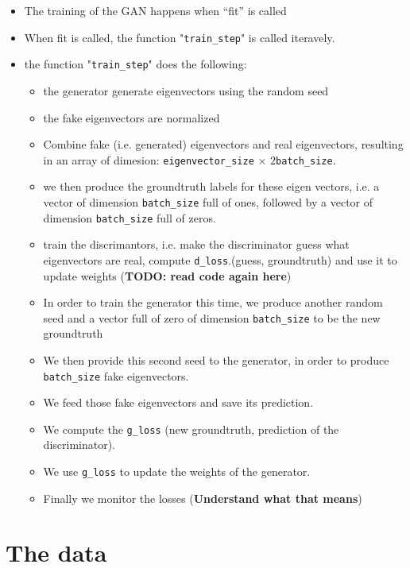 \documentclass{article}
\begin{document}
\begin{itemize}
    \item The training of the GAN happens when “fit” is called
    \item When fit is called, the function "\lstinline{train_step}" is called iteravely.
    \item the function "\lstinline{train_step}" does the following:
    \begin{itemize}
        \item the generator generate eigenvectors using the random seed 
        \item the fake eigenvectors are normalized
        \item Combine fake (i.e. generated) eigenvectors and real eigenvectors, resulting in an array of dimesion: \lstinline{eigenvector_size} $\times$ $2$\lstinline{batch_size}.
        \item we then produce the groundtruth labels for these eigen vectors, i.e. a vector of dimension \lstinline{batch_size} full of ones, followed by a vector of dimension \lstinline{batch_size} full of zeros.
        \item train the discrimantors, i.e. make the discriminator guess what eigenvectors are real, compute \lstinline{d_loss}.(guess, groundtruth) and use it to update weights (\textbf{TODO: read code again here})
        \item In order to train the generator this time, we produce another random seed and a vector full of zero of dimension \lstinline{batch_size} to be the new groundtruth
        \item We then provide this second seed to the generator, in order to produce \lstinline{batch_size} fake eigenvectors.
        \item We feed those fake eigenvectors and save its prediction. 
        \item We compute the \lstinline{g_loss} (new groundtruth, prediction of the discriminator).
        \item We use \lstinline{g_loss} to update the weights of the generator.
        \item Finally we monitor the losses (\textbf{Understand what that means})
        
    \end{itemize}
\end{itemize}


\section{The data}
\end{document}
